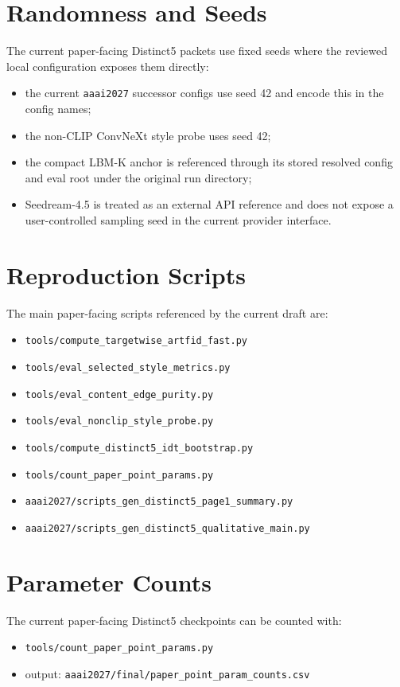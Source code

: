 \documentclass[letterpaper]{article}
\begin{document}
\section{Randomness and Seeds}
The current paper-facing Distinct5 packets use fixed seeds where the reviewed local configuration exposes them directly:
\begin{itemize}
\item the current \texttt{aaai2027} successor configs use seed 42 and encode this in the config names;
\item the non-CLIP ConvNeXt style probe uses seed 42;
\item the compact LBM-K anchor is referenced through its stored resolved config and eval root under the original run directory;
\item Seedream-4.5 is treated as an external API reference and does not expose a user-controlled sampling seed in the current provider interface.
\end{itemize}

\section{Reproduction Scripts}
The main paper-facing scripts referenced by the current draft are:
\begin{itemize}
\item \texttt{tools/compute\_targetwise\_artfid\_fast.py}
\item \texttt{tools/eval\_selected\_style\_metrics.py}
\item \texttt{tools/eval\_content\_edge\_purity.py}
\item \texttt{tools/eval\_nonclip\_style\_probe.py}
\item \texttt{tools/compute\_distinct5\_idt\_bootstrap.py}
\item \texttt{tools/count\_paper\_point\_params.py}
\item \texttt{aaai2027/scripts\_gen\_distinct5\_page1\_summary.py}
\item \texttt{aaai2027/scripts\_gen\_distinct5\_qualitative\_main.py}
\end{itemize}

\section{Parameter Counts}
The current paper-facing Distinct5 checkpoints can be counted with:
\begin{itemize}
\item \texttt{tools/count\_paper\_point\_params.py}
\item output: \texttt{aaai2027/final/paper\_point\_param\_counts.csv}
\end{itemize}
\end{document}

